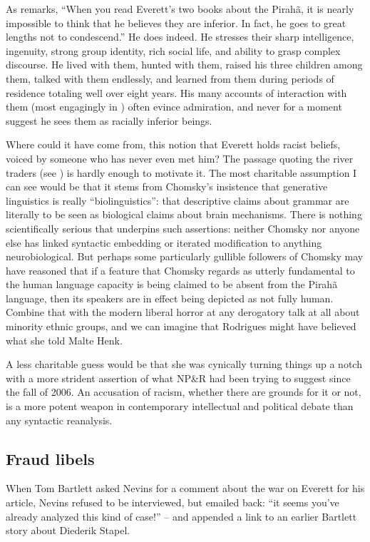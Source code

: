 \documentclass[output=paper,colorlinks,citecolor=brown
]{langscibook}
\begin{document}
As \citet{Bartlett12} remarks, ``When you read Everett’s two books about
the Pirahã, it is nearly impossible to think that he believes they
are inferior. In fact, he goes to great lengths not to condescend.''
He does indeed.  He stresses their sharp intelligence, ingenuity, strong
group identity, rich social life, and ability to grasp complex discourse.
He lived with them, hunted with them, raised his three children among
them, talked with them endlessly, and learned from them during periods
of residence totaling well over eight years. His many accounts of
interaction with them (most engagingly in \citealt{Everett08}) often
evince admiration, and never for a moment suggest he sees them as
racially inferior beings.\largerpage

Where could it have come from, this notion that Everett holds racist
beliefs, voiced by someone who has never even met him? The passage
quoting the river traders (see ) is hardly
enough to motivate it. The most charitable assumption I can see
would be that it stems from Chomsky's insistence that generative
linguistics is really ``biolinguistics'': that descriptive claims about
grammar are literally to be seen as biological claims about brain
mechanisms. There is nothing scientifically serious that underpins
such assertions: neither Chomsky nor anyone else has linked syntactic
embedding or iterated modification to anything neurobiological. But
perhaps some particularly gullible followers of Chomsky may have
reasoned that if a feature that Chomsky regards as utterly fundamental
to the human language capacity is being claimed to be absent from the
Pirahã language, then its speakers are in effect being depicted as
not fully human. Combine that with the modern liberal horror at any
derogatory talk at all about minority ethnic groups, and we can
imagine that Rodrigues might have believed what she told Malte Henk.

A less charitable guess would be that she was cynically turning things
up a notch with a more strident assertion of what NP\&R had been trying
to suggest since the fall of 2006. An accusation of racism, whether
there are grounds for it or not, is a more potent weapon in contemporary
intellectual and political debate than any syntactic reanalysis.

\subsection{Fraud libels}

When Tom Bartlett asked Nevins for a comment about the war on Everett
for his \citeyear{Bartlett12} article, Nevins refused to be interviewed,
but emailed back: ``it seems you've already analyzed this kind of case!''
-- and appended a link to an earlier Bartlett story about Diederik
Stapel.
\end{document}
